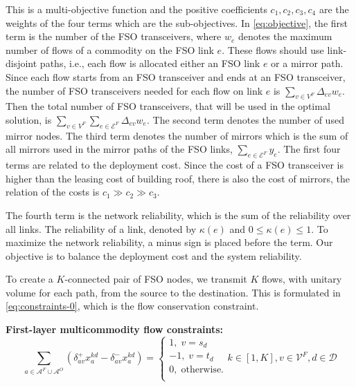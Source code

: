 \documentclass[onecolumn,11pt,draftclsnofoot]{IEEEtran}
\begin{document}
This is a multi-objective function and the positive coefficients $c_1,c_2,c_3,c_4$ are the weights of the four terms which are the sub-objectives. In \eqref{eq:objective}, the first term is the number of the FSO transceivers, where $w_e$ denotes the maximum number of flows of a commodity on the FSO link $e$. These flows should use link-disjoint paths, i.e., each flow is allocated either an FSO link $e$ or a mirror path. Since each flow starts from an FSO transceiver and ends at an FSO transceiver, the number of FSO transceivers needed for each flow on link $e$ is $\sum_{v \in V^F} \Delta_{ev} w_e$. Then the total number of  FSO transceivers,  that will be used in the optimal solution,  is $\sum_{v \in V^F} \sum_{e \in  \mathcal E^F}  \Delta_{ev} w_e $.
The  second term denotes the number of used mirror nodes.
The  third term denotes the number of mirrors which is the sum of all mirrors used in the mirror paths of the FSO links, $\sum_{e \in \mathcal E^F} y_e$.
The first four terms are related to the deployment cost. Since the cost of a FSO transceiver is higher than the leasing cost of building roof,  there is also the cost of mirrors, the relation of the costs is $c_1 \gg c_2 \gg c_3$.

The fourth term is the network reliability, which is the sum of the reliability over all links. The reliability of a link, denoted by $\kappa(e)$ and $0 \leq \kappa(e) \leq 1$. To maximize the network reliability, a  minus sign is placed before the term. Our objective is to balance the deployment cost and the system reliability.

To create a $K$-connected pair of FSO nodes, we transmit $K$ flows, with unitary volume for each path, from the source to the destination. This is formulated in \eqref{eq:constraints-0}, which is the flow conservation constraint.

\noindent \textbf{First-layer multicommodity flow constraints:}
\begin{equation}\label{eq:constraints-0}
\mbox{$\sum_{a \in \mathcal A^{F} \cup  \mathcal A^{O} } (\delta^+_{av}  x_{a}^{kd}- \delta^-_{av}  x_{a}^{kd})$}  =
                     \left\{ \begin{array}{l}
                        1, \;  v = s_d\\
                        -1, \;   v = t_d\\
                        0, \;  \mbox{otherwise.} \\
                     \end{array}
             \right.  k \in [1,K],v \in \mathcal V^F, d \in \mathcal D
\end{equation}
\end{document}
